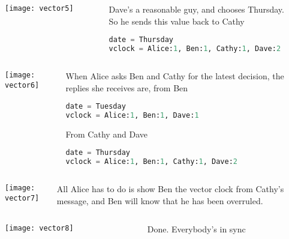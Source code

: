 \documentclass[aspectratio=169, 15pt,usenames,dvipsnames]{beamer}
\begin{document}
	\cprotEnv\begin{gdblank}
	\begin{columns}
		\begin{column}{0.5\textwidth}
			\texttt{[image: vector5]}			
		\end{column}
		\begin{column}{0.5\textwidth}				
			Dave’s a reasonable guy, and chooses Thursday.\\So he sends this value back to Cathy
			\begin{lstlisting}[language=Python]
date = Thursday
vclock = Alice:1, Ben:1, Cathy:1, Dave:2
			\end{lstlisting}
		\end{column}	
	\end{columns} 
	\end{gdblank}
	\cprotEnv\begin{gdblank}
	\begin{columns}
		\begin{column}{0.5\textwidth}
			\texttt{[image: vector6]}			
		\end{column}
		\begin{column}{0.5\textwidth}				
			When Alice asks Ben and Cathy for the latest decision, the replies she receives are, from Ben
			\begin{lstlisting}[language=Python]
date = Tuesday
vclock = Alice:1, Ben:1, Dave:1
			\end{lstlisting}
			From Cathy and Dave
			\begin{lstlisting}[language=Python]
date = Thursday
vclock = Alice:1, Ben:1, Cathy:1, Dave:2
			\end{lstlisting}
		\end{column}	
	\end{columns} 
	\end{gdblank}
	\cprotEnv\begin{gdblank}
	\begin{columns}
		\begin{column}{0.5\textwidth}
			\texttt{[image: vector7]}			
		\end{column}
		\begin{column}{0.5\textwidth}				
			All Alice has to do is show Ben the vector clock from Cathy’s message, and Ben will know that he has been overruled.
		\end{column}	
	\end{columns} 
	\end{gdblank}
	\cprotEnv\begin{gdblank}
	\begin{columns}
		\begin{column}{0.5\textwidth}
			\texttt{[image: vector8]}			
		\end{column}
		\begin{column}{0.5\textwidth}				
			Done. Everybody's in sync
		\end{column}	
	\end{columns} 
	\end{gdblank}
\end{document}
